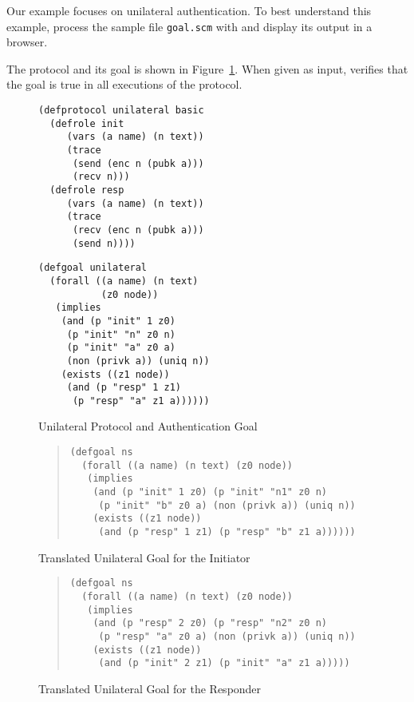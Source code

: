 \documentclass[12pt]{article}
\begin{document}
Our example focuses on unilateral authentication.  To best understand
this example, process the sample file \texttt{goal.scm} with {\cpsa}
and display its output in a browser.

The protocol and its goal is shown in Figure~\ref{fig:unilateral}.
When given as input, {\cpsa} verifies that the goal is true in all
executions of the protocol.

\begin{figure}
\begin{minipage}{2.7in}
\begin{verbatim}
(defprotocol unilateral basic
  (defrole init
     (vars (a name) (n text))
     (trace
      (send (enc n (pubk a)))
      (recv n)))
  (defrole resp
     (vars (a name) (n text))
     (trace
      (recv (enc n (pubk a)))
      (send n))))
\end{verbatim}
\end{minipage}\hfil
\begin{minipage}{3.0in}
\begin{verbatim}
(defgoal unilateral
  (forall ((a name) (n text)
           (z0 node))
   (implies
    (and (p "init" 1 z0)
     (p "init" "n" z0 n)
     (p "init" "a" z0 a)
     (non (privk a)) (uniq n))
    (exists ((z1 node))
     (and (p "resp" 1 z1)
      (p "resp" "a" z1 a))))))
\end{verbatim}
\end{minipage}
\caption{Unilateral Protocol and Authentication Goal}\label{fig:unilateral}
\end{figure}

\begin{figure}
\begin{quote}
\begin{verbatim}
(defgoal ns
  (forall ((a name) (n text) (z0 node))
   (implies
    (and (p "init" 1 z0) (p "init" "n1" z0 n)
     (p "init" "b" z0 a) (non (privk a)) (uniq n))
    (exists ((z1 node))
     (and (p "resp" 1 z1) (p "resp" "b" z1 a))))))
\end{verbatim}
\end{quote}
\caption{Translated Unilateral Goal for the
  Initiator}\label{fig:unilateral ns init}
\end{figure}

\begin{figure}
\begin{quote}
\begin{verbatim}
(defgoal ns
  (forall ((a name) (n text) (z0 node))
   (implies
    (and (p "resp" 2 z0) (p "resp" "n2" z0 n)
     (p "resp" "a" z0 a) (non (privk a)) (uniq n))
    (exists ((z1 node))
     (and (p "init" 2 z1) (p "init" "a" z1 a)))))
\end{verbatim}
\end{quote}
\caption{Translated Unilateral Goal for the
  Responder}\label{fig:unilateral ns resp}
\end{figure}
\end{document}
